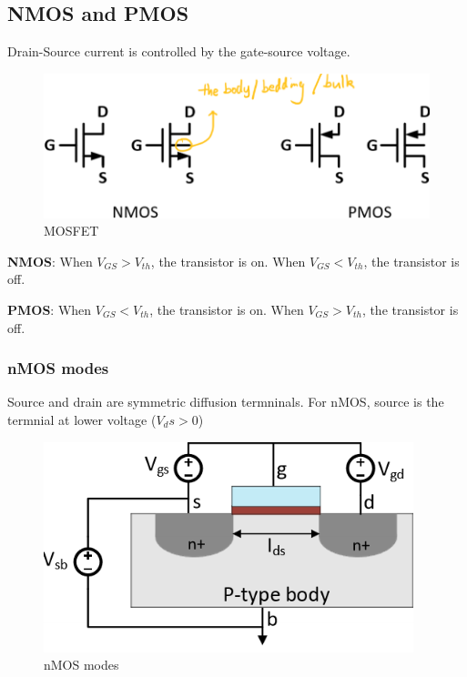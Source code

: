 \subsection{NMOS and PMOS}

Drain-Source current is controlled by the gate-source voltage.

\begin{figure}[h]
    \centering
    \includegraphics[scale=0.3]{images/NMOSandPMOS.png}
    \caption{MOSFET}
\end{figure}

\textbf{NMOS}: When $V_{GS} > V_{th}$, the transistor is on. When $V_{GS} < V_{th}$, the transistor is off.

\textbf{PMOS}: When $V_{GS} < V_{th}$, the transistor is on. When $V_{GS} > V_{th}$, the transistor is off.

\subsubsection{nMOS modes}

Source and drain are symmetric diffusion termninals. For nMOS, source is the termnial at lower voltage ($V_ds > 0$) 

\begin{figure}[h]
    \centering
    \includegraphics[scale=0.5]{images/nMOS.png}
    \caption{nMOS modes}
\end{figure}

